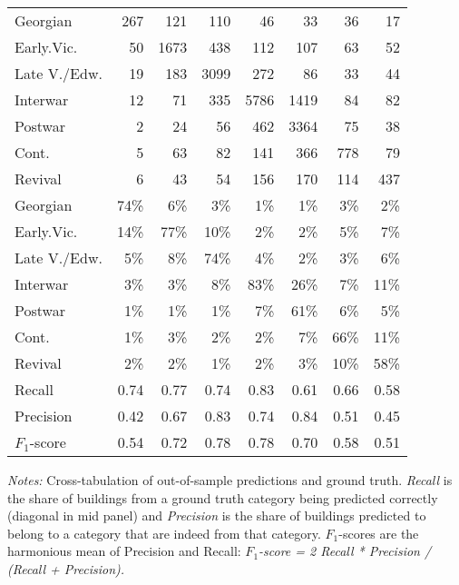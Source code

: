 \begin{table}[!htb]
\begin{tabular}{lrrrrrrr}
	Georgian & 267 & 121 & 110 & 46 & 33 & 36 & 17 \\
	  Early.Vic. & 50 & 1673 & 438 & 112 & 107 & 63 & 52 \\
	  Late V./Edw. & 19 & 183 & 3099 & 272 & 86 & 33 & 44 \\
	  Interwar & 12 & 71 & 335 & 5786 & 1419 & 84 & 82 \\
	  Postwar & 2 & 24 & 56 & 462 & 3364 & 75 & 38 \\
	  Cont. & 5 & 63 & 82 & 141 & 366 & 778 & 79 \\
	  Revival & 6 & 43 & 54 & 156 & 170 & 114 & 437 \\
	\cmidrule(lr){1-1}
\cmidrule(lr){2-8}
	  Georgian & 74\% & 6\% & 3\% & 1\% & 1\% & 3\% & 2\% \\
	  Early.Vic. & 14\% & 77\% & 10\% & 2\% & 2\% & 5\% & 7\% \\
	  Late V./Edw. & 5\% & 8\% & 74\% & 4\% & 2\% & 3\% & 6\% \\
	  Interwar & 3\% & 3\% & 8\% & 83\% & 26\% & 7\% & 11\% \\
	  Postwar & 1\% & 1\% & 1\% & 7\% & 61\% & 6\% & 5\% \\
	  Cont. & 1\% & 3\% & 2\% & 2\% & 7\% & 66\% & 11\% \\
	  Revival & 2\% & 2\% & 1\% & 2\% & 3\% & 10\% & 58\% \\
		\cmidrule(lr){1-1}
\cmidrule(lr){2-8}
	  Recall & 0.74 & 0.77 & 0.74 & 0.83 & 0.61 & 0.66 & 0.58 \\
	  Precision & 0.42 & 0.67 & 0.83 & 0.74 & 0.84 & 0.51 & 0.45 \\
	  $F_1$-score & 0.54 & 0.72 & 0.78 & 0.78 & 0.70 & 0.58 & 0.51 \\
	 \bottomrule
\end{tabular}

\begin{minipage}{\textwidth}
\footnotesize
\vspace{0.25cm}
	\emph{Notes:} Cross-tabulation of out-of-sample predictions and ground truth.
	\emph{Recall} is the share of buildings from a ground truth category being predicted correctly (diagonal in mid panel) and \emph{Precision} is the share of buildings predicted to belong to a category that are indeed from that category.
	$F_1$-scores are the harmonious mean of Precision and Recall: \emph{ $F_1$-score = 2 Recall * Precision / (Recall + Precision).}
\end{minipage}


\endgroup
\end{table}
